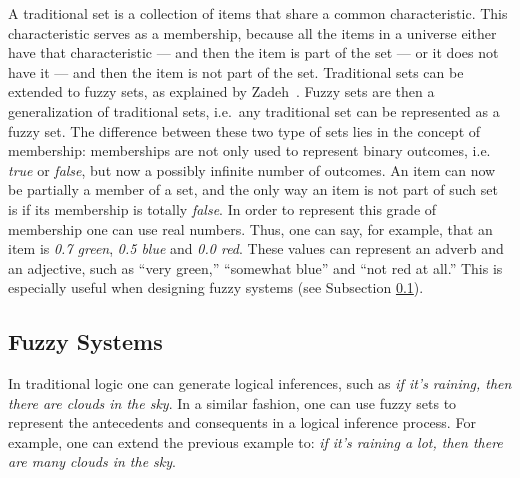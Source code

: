 \documentclass{ieeeaccess}
\begin{document}
A traditional set is a collection of items that share a common
characteristic. This characteristic serves as a membership, because all the
items in a universe either have that characteristic --- and then the item is
part of the set --- or it does not have it --- and then the item is not part of
the set. Traditional sets can be extended to fuzzy sets, as explained by
Zadeh~\cite{Zadeh1965}.
Fuzzy sets are then a generalization of traditional sets,
i.e.\ any traditional set can be represented as a fuzzy set. The difference
between these two type of sets lies in the concept of membership: memberships
are not only used to represent binary outcomes, i.e. \textit{true} or
\textit{false}, but now a possibly infinite number of outcomes. An item can now
be partially a member of a set, and the only way an item is not part of such set
is if its membership is totally \textit{false}. In order to represent this grade
of membership one can use real numbers. Thus, one can say, for example, that an
item is \textit{0.7 green}, \textit{0.5 blue} and \textit{0.0 red}. These values
can represent an adverb and an adjective, such as ``very green,'' ``somewhat
blue'' and ``not red at all.'' This is especially useful when designing fuzzy
systems (see Subsection \ref{subsection:fuzzy-systems}).

\subsection{Fuzzy Systems}
\label{subsection:fuzzy-systems}


In traditional logic one can generate logical inferences, such as \textit{if
it's raining, then there are clouds in the sky}. In a similar fashion, one can
use fuzzy sets to represent the antecedents and consequents in a logical
inference process. For example, one can extend the previous example to:
\textit{if it's raining a lot, then there are many clouds in the sky}.
\end{document}

